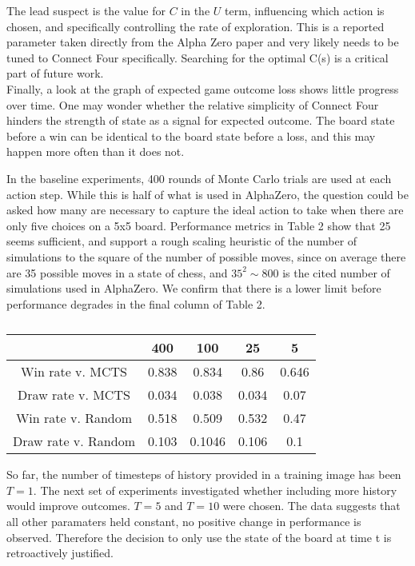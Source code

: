 \documentclass[twoside,11pt]{article}
\begin{document}
 The lead suspect is the value for $C$ in the $U$ term, 
influencing which action is chosen, and specifically controlling the rate of exploration.
This is a reported parameter taken directly from the Alpha Zero paper and very likely needs to be tuned 
to Connect Four specifically. Searching for the optimal C(s) is a critical part of future work.\\
Finally, a look at the graph of expected game outcome loss shows little progress over time.
One may wonder whether the relative simplicity of Connect Four hinders the strength 
of state as a signal for expected outcome. The board state before a win can 
be identical to the board state before a loss, and this may happen more often than it does not.


In the baseline experiments, 400 rounds of Monte Carlo trials are used at each 
action step. While this is half of what is used in AlphaZero, the question could
be asked how many are necessary to capture the ideal action to take when 
there are only five choices on a 5x5 board. Performance metrics in Table 2 
show that 25 seems sufficient, and support a rough
scaling heuristic of the number of simulations 
to the square of the number of possible moves,
since on average \cite{thirtyFive} there are 35 possible moves in a state of chess, 
and $35^2 \sim 800$ is the cited number of simulations used in AlphaZero. We confirm
that there is a lower limit before performance degrades in the final column of Table 2. 


\begin{table}[ht]
    \caption{}
\begin{center}
    \begin{tabular}{||c c c c c||} 
    \hline
     & 400 & 100 & 25 & 5 \\ [0.5ex] 
    \hline\hline
    Win rate v. MCTS & 0.838 & 0.834 & 0.86 & 0.646\\ 
    \hline
    Draw rate v. MCTS & 0.034 & 0.038 & 0.034 & 0.07\\
    \hline
    Win rate v. Random &  0.518 & 0.509 & 0.532 &0.47\\
    \hline
    Draw rate v. Random & 0.103 & 0.1046 & 0.106 &0.1\\
    \hline
   \end{tabular}
   \end{center}
\end{table}


So far, the number of timesteps of history provided in a training image has been $T=1$. 
The next set of experiments investigated whether including more history would improve
outcomes. $T=5$ and $T=10$ were chosen. The data suggests that all other paramaters held
constant, no positive change in performance is observed. Therefore the decision to only use
the state of the board at time t is retroactively justified.
\end{document}
